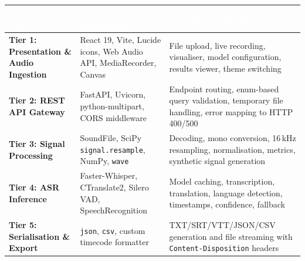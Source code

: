\documentclass[11pt,a4paper]{article}
\newcommand{\thc}[1]{\textcolor{white}{\bfseries #1}}
\newcommand{\headrow}{\rowcolor{headblue}}
\begin{document}
\begin{tabularx}{\textwidth}{|L{3.3cm}|L{4.6cm}|Y|}
\hline
\headrow \thc{Architectural Tier} & \thc{Components \& Technologies} & \thc{Core Responsibilities} \\ \hline
\textbf{Tier 1: Presentation \& Audio Ingestion} & React 19, Vite, Lucide icons, Web Audio API, MediaRecorder, Canvas & File upload, live recording, visualiser, model configuration, results viewer, theme switching \\ \hline
\textbf{Tier 2: REST API Gateway} & FastAPI, Uvicorn, python-multipart, CORS middleware & Endpoint routing, enum-based query validation, temporary file handling, error mapping to HTTP 400/500 \\ \hline
\textbf{Tier 3: Signal Processing} & SoundFile, SciPy \texttt{signal.resample}, NumPy, \texttt{wave} & Decoding, mono conversion, 16\,kHz resampling, normalisation, metrics, synthetic signal generation \\ \hline
\textbf{Tier 4: ASR Inference} & Faster-Whisper, CTranslate2, Silero VAD, SpeechRecognition & Model caching, transcription, translation, language detection, timestamps, confidence, fallback \\ \hline
\textbf{Tier 5: Serialisation \& Export} & \texttt{json}, \texttt{csv}, custom timecode formatter & TXT/SRT/VTT/JSON/CSV generation and file streaming with \texttt{Content-Disposition} headers \\ \hline
\end{tabularx}
\end{document}
